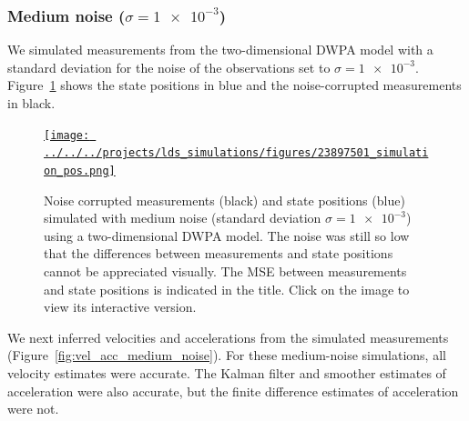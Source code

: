 \documentclass[12pt]{article}
\begin{document}
\subsubsection{Medium noise ($\sigma=\num{1e-3}$)}

We simulated measurements from the two-dimensional DWPA model with a standard
deviation for the noise of the observations set to $\sigma=\num{1e-3}$.
Figure~\ref{fig:simulations_medium_noise} shows the state positions in blue and
the noise-corrupted measurements in black.

\begin{figure}

    \centering
    \href{http://www.gatsby.ucl.ac.uk/~rapela/fwg/lds_repo/inference/figures/23897501_simulation_pos.html}{\texttt{[image: ../../../projects/lds\_simulations/figures/23897501\_simulation\_pos.png]}}

    \caption{Noise corrupted measurements (black) and state positions (blue)
    simulated with medium noise (standard deviation $\sigma=\num{1e-3}$) using
    a two-dimensional DWPA model.  The noise was still so low that the
    differences between measurements and state positions cannot be appreciated
    visually.  The MSE between measurements and state positions is indicated in
    the title. Click on the image to view its interactive version.}

    \label{fig:simulations_medium_noise}

\end{figure}

We next inferred velocities and accelerations from the simulated measurements
(Figure~\ref{fig:vel_acc_medium_noise}). For these medium-noise simulations,
all velocity estimates were accurate. The Kalman filter and smoother estimates
of acceleration were also accurate, but the finite difference estimates of
acceleration were not.
\end{document}
